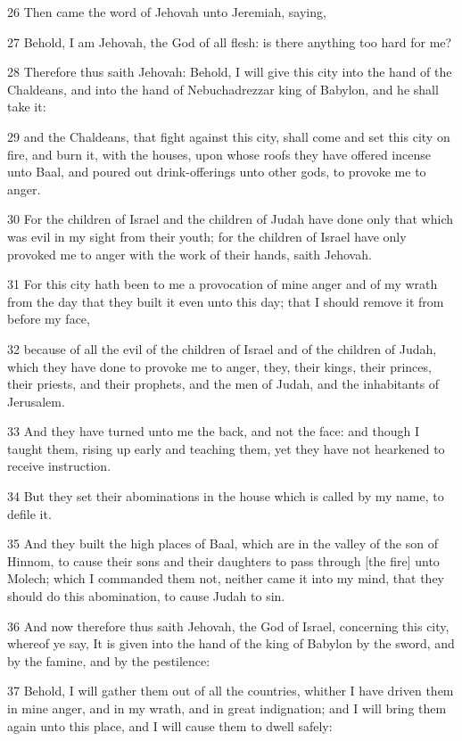 \par 26 Then came the word of Jehovah unto Jeremiah, saying,
\par 27 Behold, I am Jehovah, the God of all flesh: is there anything too hard for me?
\par 28 Therefore thus saith Jehovah: Behold, I will give this city into the hand of the Chaldeans, and into the hand of Nebuchadrezzar king of Babylon, and he shall take it:
\par 29 and the Chaldeans, that fight against this city, shall come and set this city on fire, and burn it, with the houses, upon whose roofs they have offered incense unto Baal, and poured out drink-offerings unto other gods, to provoke me to anger.
\par 30 For the children of Israel and the children of Judah have done only that which was evil in my sight from their youth; for the children of Israel have only provoked me to anger with the work of their hands, saith Jehovah.
\par 31 For this city hath been to me a provocation of mine anger and of my wrath from the day that they built it even unto this day; that I should remove it from before my face,
\par 32 because of all the evil of the children of Israel and of the children of Judah, which they have done to provoke me to anger, they, their kings, their princes, their priests, and their prophets, and the men of Judah, and the inhabitants of Jerusalem.
\par 33 And they have turned unto me the back, and not the face: and though I taught them, rising up early and teaching them, yet they have not hearkened to receive instruction.
\par 34 But they set their abominations in the house which is called by my name, to defile it.
\par 35 And they built the high places of Baal, which are in the valley of the son of Hinnom, to cause their sons and their daughters to pass through [the fire] unto Molech; which I commanded them not, neither came it into my mind, that they should do this abomination, to cause Judah to sin.
\par 36 And now therefore thus saith Jehovah, the God of Israel, concerning this city, whereof ye say, It is given into the hand of the king of Babylon by the sword, and by the famine, and by the pestilence:
\par 37 Behold, I will gather them out of all the countries, whither I have driven them in mine anger, and in my wrath, and in great indignation; and I will bring them again unto this place, and I will cause them to dwell safely:
